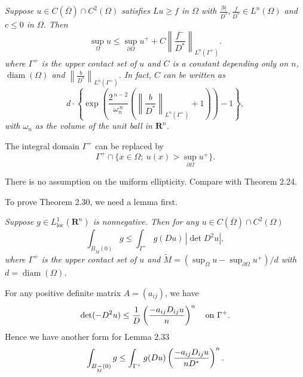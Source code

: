 \begin{theorem}\label{hanlin:maxprin-theorem-2-30}
\textit{Suppose $u \in C(\overline{\Omega}) \cap C^2(\Omega)$
satisfies $Lu \ge f$ in $\Omega$ with $\frac{|b|}{D^*}, \frac{f}{D^*} \in L^n(\Omega)$
and $c \le 0$ in $\Omega$. Then}
\[
\sup_{\Omega} u \le \sup_{\partial \Omega} u^+ + C\left\|\frac{f^-}{D^*}\right\|_{L^n(\Gamma^+)}.
\]
\textit{where $\Gamma^+$ is the upper contact set of $u$ and $C$ is a constant depending only on $n$,
$\operatorname{diam}(\Omega)$ and $\left\|\frac{b}{D^*}\right\|_{L^n(\Gamma^+)}$. In fact, $C$ can be written as}
\[
d \cdot \left\{\exp\!\left(\frac{2^{\,n-2}}{\omega_n^{\,n}}\left(\left\|\frac{b}{D^*}\right\|_{L^n(\Gamma^+)} + 1\right)\right) - 1\right\},
\]
\textit{with $\omega_n$ as the volume of the unit ball in $\mathbf{R}^n$.}
\end{theorem}

\begin{remark}\label{hanlin:maxprin-remark-2-31}
The integral domain $\Gamma^+$ can be replaced by
\[
\Gamma^+ \cap \{x \in \Omega;\ u(x) > \sup_{\partial \Omega} u^+\}.
\]
\end{remark}

\begin{remark}\label{hanlin:maxprin-remark-2-32}
There is no assumption on the uniform ellipticity. Compare
with Theorem 2.24.
\end{remark}

To prove Theorem 2.30, we need a lemma first.

\begin{lemma}\label{hanlin:maxprin-lemma-2-33}
\textit{Suppose $g \in L^1_{\mathrm{loc}}(\mathbf{R}^n)$ is
nonnegative. Then for any $u \in C(\overline{\Omega}) \cap C^2(\Omega)$}
\[
\int_{B_{\widetilde{M}}(0)} g \le \int_{\Gamma^+} g(Du)\,|\det D^2u|,
\]
\textit{where $\Gamma^+$ is the upper contact set of $u$ and $\widetilde{M} =
(\sup_{\Omega} u - \sup_{\partial \Omega} u^+)/d$ with $d = \operatorname{diam}(\Omega)$.}
\end{lemma}

\begin{remark}\label{hanlin:maxprin-remark-2-34}
For any positive definite matrix $A=(a_{ij})$, we have
\[
\det(-D^2u)\le \frac{1}{D}\left(\frac{-a_{ij}D_{ij}u}{n}\right)^n
\quad \text{on } \Gamma^+.
\]
Hence we have another form for Lemma 2.33
\[
\int_{B_{\widetilde{M}}(0)} g \le \int_{\Gamma^+} g(Du)\left(\frac{-a_{ij}D_{ij}u}{nD^*}\right)^n.
\]
\end{remark}

